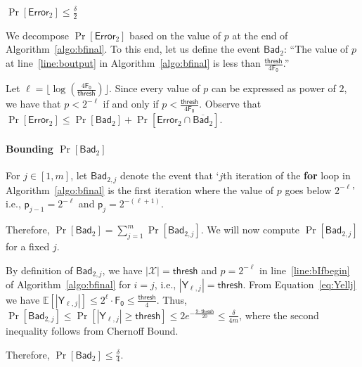 \documentclass[a4paper,UKenglish,cleveref, autoref, thm-restate]{lipics-v2021}
\makeatletter
\newenvironment{proof*}[1][\proofname]{\par
  \pushQED{\qed}
  \normalfont \partopsep=\z@skip \topsep=\z@skip
  \trivlist
  \item[\hskip\labelsep
        \itshape
    #1\@addpunct{.}]\ignorespaces
}{
  \popQED\endtrivlist\@endpefalse
}
\newcommand{\Fo}{\ensuremath{\mathsf{F_0}}}
\newcommand{\p}{\mathsf{p}}
\newcommand{\Error}{\mathsf{Error}}
\newcommand{\bad}{\ensuremath{\mathsf{Bad}_{2}}}
\newcommand{\Bad}[1]{\ensuremath{\mathsf{Bad}_{2,{#1}}}}
\newcommand{\thresh}{\mathsf{thresh}}
\makeatother
\begin{document}
\begin{claim}\label{lm:error-fail}
$\Pr[\Error_{2}] \leq \frac{\delta}{2}$
\end{claim}
\begin{proof*}

We decompose  $\Pr[\Error_{2}]$ based on the value of $p$ at the end of Algorithm~\ref{algo:bfinal}. To this end, let us define the event
    $\bad$: ``The value of $p$ at line~\ref{line:boutput} in Algorithm~\ref{algo:bfinal} is less than  $\frac{\thresh}{4\Fo}$.''


Let $\ell =  \lfloor \log (\frac{4\Fo}{\thresh} ) \rfloor $. Since every value of $p$ can be expressed as power of $2$, we have that  $p < 2^{-\ell}$ if and only if $p < \frac{\thresh}{4\Fo}$. 
Observe that $\Pr[\Error_{2}] \leq  \Pr[\bad ] + \Pr [\Error_{2} \cap   \overline{\bad}].$ 









\paragraph*{Bounding $\Pr[\bad] $}







For $j \in [1,m]$, let $\Bad{j}$ denote the event that `$j$th iteration of the \textbf{for} loop in Algorithm~\ref{algo:bfinal} is the first iteration where the value of $p$ goes below $2^{-\ell}$' i.e., $\p_{j-1} = 2^{-\ell}$ and $\p_{j} = 2^{-(\ell+1)}$.  

Therefore,  $\Pr[\bad] = \sum_{j=1}^{m} \Pr[\Bad{j}] $. We will now compute $\Pr[\Bad{j}]$ for a fixed $j$. 




By definition of $\Bad{j}$, we have  $|\mathcal{X}| = \thresh$ and $p=2^{-\ell}$ in line~\ref{line:bIfbegin} of Algorithm~\ref{algo:bfinal} for $i=j$, i.e., $|\mathsf{Y}_{\ell, j}| = \thresh$. 
From Equation~\ref{eq:Yellj} we have $\mathbb{E}\left[|\mathsf{Y}_{\ell,j}|\right] \leq 2^{\ell} \cdot \Fo \leq \frac{\thresh}{4}.$
Thus, 
$\Pr[\Bad{j}] \leq \Pr[|\mathsf{Y}_{\ell,j}| \geq \thresh]
 \leq 2e^{-\frac{9 \cdot \thresh}{20}}   \leq \frac{\delta}{4m}$, where the second inequality follows from  Chernoff Bound. 


Therefore, $\Pr[\bad] \leq \frac{\delta}{4}$.





\end{proof*}
\end{document}
